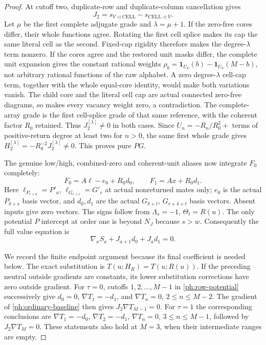 \documentclass[11pt,a4paper]{amsart}
\numberwithin{equation}{section}
\theoremstyle{plain}
\theoremstyle{definition}
\newcommand{\one}{\mathbf1}
\begin{document}
\begin{proof}
At cutoff two, duplicate-row and duplicate-column cancellation gives
\[
 J_2=s_{V\triangleleft\mathrm{CELL}}
                 -s_{\mathrm{CELL}\triangleleft V}.
\]
Let \(\mu\) be the first complete adjugate grade and
\(\lambda=\mu+1\).  If the zero-free cores differ, their whole
functions agree.  Rotating the first cell splice makes its cap the
same literal cell as the second.  Fixed-cap rigidity
\cite{Shields2026Coframes} therefore makes the degree-\(\lambda\)
term nonzero.  If the cores agree and the restored unit masks differ,
the complete unit expansion gives the constant rational weights
\(\rho_b=\one_{U_V}(b)-\one_{U_V}(M-b)\), not arbitrary rational
functions of the raw alphabet.  A zero degree-\(\lambda\) cell-cap
term, together with the whole equal-core identity, would make both
variations vanish.  The child core and the literal cell cap are
actual connected zero-free diagrams, so
\cite[Zero-free linearized fixed-cap rigidity]{Shields2026Coframes}
makes every vacancy weight zero, a contradiction.  The complete-array
grade is the first cell-splice grade of that same reference, with
the coherent factor \(R_0\) retained.
Thus \(J_2^{[\lambda]}\ne0\) in both cases.
Since \(U_n=-R_n/R_0^2+\) terms of positive-return degree at
least two for \(n>0\), the same first whole grade gives
\(H_2^{[\lambda]}=-R_0^{-2}J_2^{[\lambda]}\ne0\).
This proves pure \(PG\).

The genuine low/high, combined-zero and coherent-unit aliases now
integrate \(F_0\) completely:
\[
 F_0=A\ell-e_0+R_0d_0,\qquad F_1=Ax+R_0d_1.
\]
Here \(\ell_{P_{r+a}}=P'_a\), \(\ell_{G_{r+c}}=G'_c\) at actual
nonreturned mates only; \(e_0\) is the actual \(P_{\delta+s}\) basis
vector, and \(d_0,d_1\) are the actual \(G_{\delta+t}\),
\(G_{r+\delta+t}\) basis vectors.  Absent inputs give zero vectors.
The signs follow from \(\Lambda_s=-1\), \(\Theta_t=R(u)\).
The only potential \(P\) intercept at order one is beyond \(N_J\)
because \(s>w\).  Consequently the full value equation is
\begin{equation}\label{ph:row-potential}
 \nabla_xS_a+J_{a+1}d_0+J_ad_1=0.
\end{equation}

We record the finite endpoint argument because its final coefficient is
needed below.  The exact substitution is
\(T(u;H_R)=T(u;R(u))\).
If the preceding neutral outside gradients are constants, its lower
substitution corrections have zero outside gradient.
For \(\tau=0\), cutoffs \(1,2,\ldots,M-1\) in
\eqref{ph:row-potential} successively give
\(d_0=0\), \(\nabla T_1=-d_1\), and
\(\nabla T_n=0\), \(2\le n\le M-2\).
The gradient of \eqref{ph:ordinary-baseline} then gives
\(J_2\nabla T_{M-1}=0\).
For \(\tau=1\) the corresponding conclusions are
\(\nabla T_1=-d_0\), \(\nabla T_2=-d_1\),
\(\nabla T_n=0\), \(3\le n\le M-1\), followed by
\(J_2\nabla T_M=0\).
These statements also hold at \(M=3\), when their intermediate ranges
are empty.


\end{proof}
\end{document}

